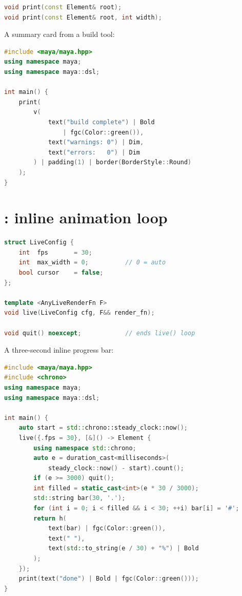 \begin{lstlisting}[language=C++]
void print(const Element& root);
void print(const Element& root, int width);
\end{lstlisting}

\noindent A summary card from a build tool:

\begin{lstlisting}[language=C++]
#include <maya/maya.hpp>
using namespace maya;
using namespace maya::dsl;

int main() {
    print(
        v(
            text("build complete") | Bold
                | fgc(Color::green()),
            text("warnings: 0") | Dim,
            text("errors:   0") | Dim
        ) | padding(1) | border(BorderStyle::Round)
    );
}
\end{lstlisting}

\section{: inline animation loop}

\begin{lstlisting}[language=C++]
struct LiveConfig {
    int  fps       = 30;
    int  max_width = 0;          // 0 = auto
    bool cursor    = false;
};

template <AnyLiveRenderFn F>
void live(LiveConfig cfg, F&& render_fn);

void quit() noexcept;            // ends live() loop
\end{lstlisting}

\noindent A three-second inline progress bar:

\begin{lstlisting}[language=C++]
#include <maya/maya.hpp>
#include <chrono>
using namespace maya;
using namespace maya::dsl;

int main() {
    auto start = std::chrono::steady_clock::now();
    live({.fps = 30}, [&]() -> Element {
        using namespace std::chrono;
        auto e = duration_cast<milliseconds>(
            steady_clock::now() - start).count();
        if (e >= 3000) quit();
        int filled = static_cast<int>(e * 30 / 3000);
        std::string bar(30, '.');
        for (int i = 0; i < filled && i < 30; ++i) bar[i] = '#';
        return h(
            text(bar) | fgc(Color::green()),
            text(" "),
            text(std::to_string(e / 30) + "%") | Bold
        );
    });
    print(text("done") | Bold | fgc(Color::green()));
}
\end{lstlisting}


